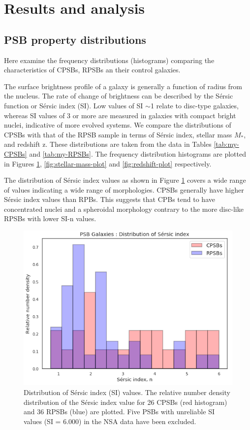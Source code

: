 \section{Results and analysis}
\label{sec:results}

\subsection{PSB property distributions}
\label{sec:property-distributions}
Here examine the frequency distributions (histograms) comparing the characteristics of CPSBs, RPSBs an their control galaxies.

The surface brightness profile of a galaxy is generally a function of radius from the nucleus. The rate of change of brightness can be described by the S\'ersic function or S\'ersic  index (SI). Low values of SI $\sim$1 relate to disc-type galaxies, whereas SI values of 3 or more are measured in galaxies with compact bright nuclei, indicative of more evolved systems. We compare the distributions of CPSBs with that of the RPSB sample in terms of S\'ersic index, stellar mass $M_*$, and redshift z. These distributions are taken from the data in Tables \ref{tab:my-CPSBs} and \ref{tab:my-RPSBs}. The frequency distribution histograms are plotted in Figures \ref{fig:Sersic-plot}, \ref{fig:stellar-mass-plot} and \ref{fig:redshift-plot} respectively.

The distribution of S\'ersic index values as shown in Figure \ref{fig:Sersic-plot} covers a wide range of values indicating a wide range of morphologies. CPSBs  generally have higher S\'ersic index values than RPBs. This suggests that CPBs tend to have concentrated nuclei and a spheroidal morphology contrary to the more disc-like RPSBs with lower SI-n values.

\begin{figure}
    \centering
    \includegraphics[width=\columnwidth]{images/JupyterPlots/Dist-Sersic-Index-All.png}
    \caption{Distribution of S\'ersic index (SI) values. The relative number density distribution of the S\'ersic index value for 26 CPSBs (red histogram) and 36 RPSBs (blue) are plotted. Five PSBs with unreliable SI values (SI = 6.000) in the NSA data  have been excluded.}
    \label{fig:Sersic-plot}
\end{figure}

